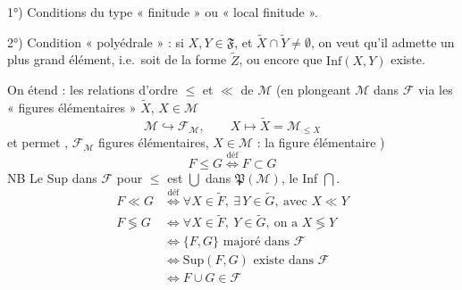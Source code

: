 \documentclass[11pt,a4paper]{article}
\begin{document}
1°) Conditions du type « finitude » ou « local finitude ».

\struck{\ill{}} 2°) Condition  « polyédrale » : si $X, Y \in \mathfrak{F}$, et $\widetilde{X} \cap \widetilde{Y} \neq \emptyset$, on  veut qu'il  admette un plus grand élément, i.e.\ soit de la forme $\widetilde{Z}$, ou encore que $\mathrm{Inf}(X,Y)$ existe.



On étend : les relations d'ordre $\leq$ et $\ll$ de $\mathcal{M}$ (en plongeant $\mathcal{M}$ dans $\mathcal{F}$ via les « figures élémentaires » $\widetilde{X}$, $X \in \mathcal{M}$
\[
  \mathcal{M} \hookrightarrow \mathcal{F}_{\mathcal{M}},\qquad X \mapsto \widetilde{X} = \mathcal{M}_{\leq X}
\]
 et permet  \ill{}, \ill{} $\mathcal{F}_{\mathcal{M}}$ \ill{} figures élémentaires, $X \in \mathcal{M}$ : la figure élémentaire  \ill{})
\[
  F \leq G \overset{\text{déf}}{\Longleftrightarrow} F \subset G
\]
NB Le Sup dans $\mathcal{F}$ pour $\leq$ est $\bigcup$ dans $\mathfrak{P}(\mathcal{M})$, le Inf $\bigcap$.
\[
\begin{aligned}
  F \ll G &\overset{\text{déf}}{\Longleftrightarrow} \forall X \in \widetilde{F},\ \exists\, Y \in \widetilde{G},\ \text{avec } X \ll Y \\
  F \lessgtr G &\Longleftrightarrow \forall X \in \widetilde{F},\ Y \in \widetilde{G},\ \text{on a } X \lessgtr Y \\
  &\Longleftrightarrow \{F, G\} \text{ majoré dans } \mathcal{F} \\
  &\Longleftrightarrow \mathrm{Sup}(F,G) \text{ existe dans } \mathcal{F} \\
  &\Longleftrightarrow F \cup G \in \mathcal{F}
\end{aligned}
\]

\end{document}
